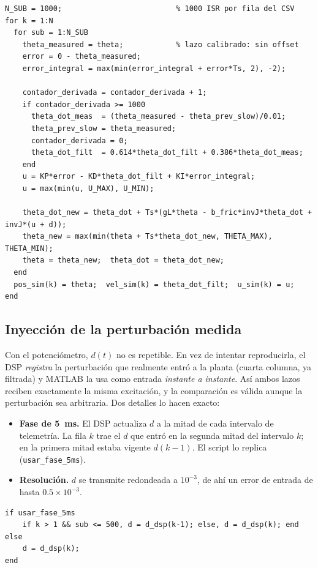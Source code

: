 \documentclass[11pt,a4paper]{article}
\begin{document}
\begin{lstlisting}[language=matlabx,caption={Lazo de simulaci\'on en MATLAB (misma estructura que la ISR).}]
N_SUB = 1000;                          % 1000 ISR por fila del CSV
for k = 1:N
  for sub = 1:N_SUB
    theta_measured = theta;            % lazo calibrado: sin offset
    error = 0 - theta_measured;
    error_integral = max(min(error_integral + error*Ts, 2), -2);

    contador_derivada = contador_derivada + 1;
    if contador_derivada >= 1000
      theta_dot_meas  = (theta_measured - theta_prev_slow)/0.01;
      theta_prev_slow = theta_measured;
      contador_derivada = 0;
      theta_dot_filt  = 0.614*theta_dot_filt + 0.386*theta_dot_meas;
    end
    u = KP*error - KD*theta_dot_filt + KI*error_integral;
    u = max(min(u, U_MAX), U_MIN);

    theta_dot_new = theta_dot + Ts*(gL*theta - b_fric*invJ*theta_dot + invJ*(u + d));
    theta_new = max(min(theta + Ts*theta_dot_new, THETA_MAX), THETA_MIN);
    theta = theta_new;  theta_dot = theta_dot_new;
  end
  pos_sim(k) = theta;  vel_sim(k) = theta_dot_filt;  u_sim(k) = u;
end
\end{lstlisting}

\subsection{Inyecci\'on de la perturbaci\'on medida}
Con el potenci\'ometro, $d(t)$ no es repetible. En vez de intentar reproducirla, el DSP \emph{registra} la
perturbaci\'on que realmente entr\'o a la planta (cuarta columna, ya filtrada) y MATLAB la usa como entrada
\emph{instante a instante}. As\'i ambos lazos reciben exactamente la misma excitaci\'on, y la comparaci\'on es
v\'alida aunque la perturbaci\'on sea arbitraria. Dos detalles lo hacen exacto:
\begin{itemize}[leftmargin=1.6em]
\item \textbf{Fase de 5~ms.} El DSP actualiza $d$ a la mitad de cada intervalo de telemetr\'ia. La fila $k$ trae el $d$
que entr\'o en la segunda mitad del intervalo $k$; en la primera mitad estaba vigente $d(k-1)$. El script lo replica
(\texttt{usar\_fase\_5ms}).
\item \textbf{Resoluci\'on.} $d$ se transmite redondeada a $10^{-3}$, de ah\'i un error de entrada de hasta
$0.5\times10^{-3}$.
\end{itemize}
\begin{lstlisting}[language=matlabx,caption={Perturbaci\'on vigente en cada paso.}]
if usar_fase_5ms
    if k > 1 && sub <= 500, d = d_dsp(k-1); else, d = d_dsp(k); end
else
    d = d_dsp(k);
end
\end{lstlisting}
\end{document}
